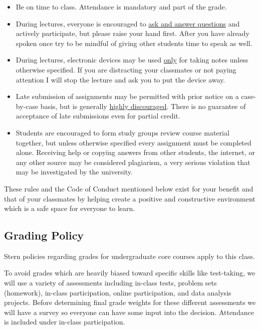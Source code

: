 \documentclass[11pt]{article}
\begin{document}
\begin{itemize}
\item Be on time to class. Attendance is mandatory and part of the grade.
\item During lectures, everyone is encouraged to \underline{ask and answer questions} and actively participate, but please raise your hand first. After you have already spoken once try to be mindful of giving other students time to speak as well.
\item During lectures, electronic devices may be used \underline{only} for taking notes unless otherwise specified. If you are distracting your classmates or not paying attention I will stop the lecture and ask you to put the device away.
\item Late submission of assignments may be permitted with prior notice on a case-by-case basis, but is generally \underline{highly discouraged}. There is no guarantee of acceptance of late submissions even for partial credit.
\item Students are encouraged to form study groups review course material together, but unless otherwise specified every assignment must be completed alone. Receiving help or copying answers from other students, the internet, or any other source may be considered plagiarism, a very serious violation that may be investigated by the university.
\end{itemize}

These rules and the Code of Conduct mentioned below exist for your benefit and that of your classmates by helping create a positive and constructive environment which is a safe space for everyone to learn.

\subsection*{Grading Policy}

Stern policies regarding grades for undergraduate core courses apply to this class.

To avoid grades which are heavily biased toward specific skills like test-taking, we will use a variety of assessments including in-class tests, problem sets (homework), in-class participation, online participation, and data analysis projects. Before determining final grade weights for these different assessments we will have a survey so everyone can have some input into the decision. Attendance is included under in-class participation.

\end{document}
